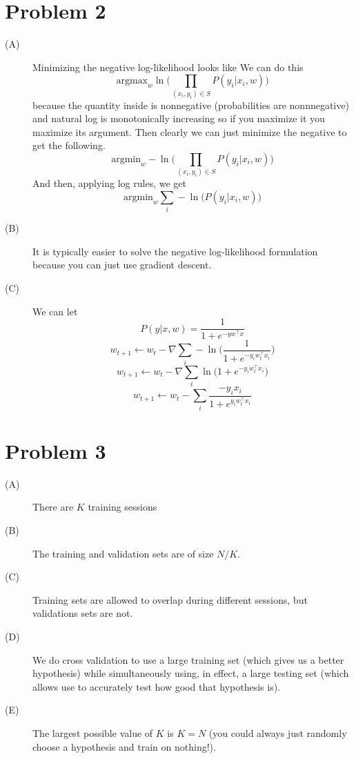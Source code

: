 \documentclass{article}
\begin{document}
\section*{Problem 2}
\begin{description}
    \item[(A)]
        Minimizing the negative log-likelihood looks like
        We can do this
        \[ \text{argmax}_w \ln \Big( \prod_{(x_i,y_i) \in S} P(y_i | x_i,w) \Big) \]
        because the quantity inside is nonnegative (probabilities are nonnnegative)
        and natural log is monotonically increasing so if you maximize it you
        maximize its argument.
        Then clearly we can just minimize the negative to get the following.
        \[ \text{argmin}_w -\ln \Big( \prod_{(x_i,y_i) \in S} P(y_i | x_i,w)
        \Big) \]
        And then, applying log rules, we get
        \[ \text{argmin}_w \sum_i - \ln \Big(P(y_i | x_i,w) \Big) \]
    \item[(B)]
        It is typically easier to solve the negative log-likelihood formulation
        because you can just use gradient descent.
    \item[(C)]
        We can let
        \[ P(y|x,w) = \frac{1}{1+e^{-yw^{\intercal}x}} \]
        \[ w_{t+1} \leftarrow w_t - \nabla \sum_i - \ln \Big(
        \frac{1}{1+e^{-y_i w^{\intercal}_t x_i}} \Big) \]
        \[ w_{t+1} \leftarrow w_t - \nabla \sum_i \ln \Big(
        1+e^{-y_i w^{\intercal}_t x_i} \Big) \]
        \[ w_{t+1} \leftarrow w_t - \sum_i
        \frac{-y_i x_i}{1+e^{y_i w^{\intercal}_t x_i}} \]
\end{description}

\section*{Problem 3}
\begin{description}
    \item[(A)] There are $K$ training sessions
    \item[(B)] The training and validation sets are of size $N/K$.
    \item[(C)] Training sets are allowed to overlap during different sessions,
        but validations sets are not.
    \item[(D)] We do cross validation to use a large training set (which gives
        us a better hypothesis) while simultaneously using, in effect, a large
        testing set (which allows use to accurately test how good that hypothesis is).
    \item[(E)] The largest possible value of $K$ is $K=N$ (you could always
        just randomly choose a hypothesis and train on nothing!).
\end{description}
\end{document}
